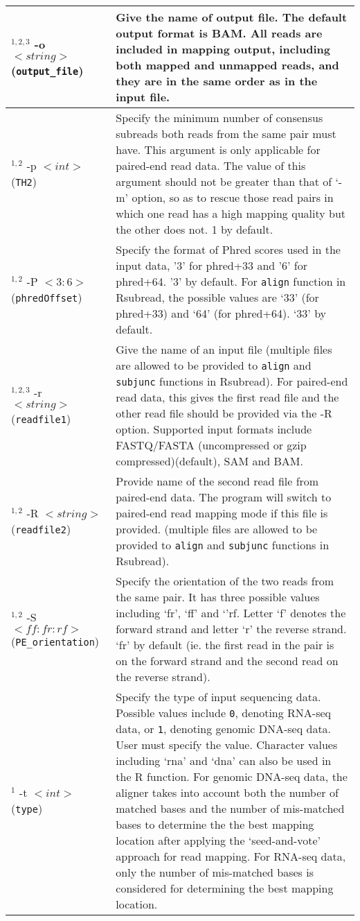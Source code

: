 \documentclass[12pt]{report}
\newcommand{\code}[1]{{\small\texttt{#1}}}
\newcommand{\Rsubread}{\textsf{Rsubread}}
\newcommand{\R}{\textsf{R}}
\begin{document}
\begin{longtable}{|p{5.5cm}|p{10.5cm}|}
\hline
$^{1,2,3}$ -o $<string>$ \newline (\code{output\_file}) & Give the name of output file. The default output format is BAM. All reads are included in mapping output, including both mapped and unmapped reads, and they are in the same order as in the input file.\\
\hline
$^{1,2}$ -p $<int>$ \newline (\code{TH2}) & Specify the minimum number of consensus subreads both reads from the same pair must have. This argument is only applicable for paired-end read data. The value of this argument should not be greater than that of `-m' option, so as to rescue those read pairs in which one read has a high mapping quality but the other does not. 1 by default.\\
\hline
$^{1,2}$ -P $<3:6>$ \newline (\code{phredOffset}) & Specify the format of Phred scores used in the input data, '3' for phred+33 and '6' for phred+64. '3' by default. For \code{align} function in \Rsubread, the possible values are `33' (for phred+33) and `64' (for phred+64). `33' by default.\\
\hline
$^{1,2,3}$ -r $<string>$ \newline (\code{readfile1}) & Give the name of an input file (multiple files are allowed to be provided to \code{align} and \code{subjunc} functions in {\Rsubread}). For paired-end read data, this gives the first read file and the other read file should be provided via the -R option. Supported input formats include FASTQ/FASTA (uncompressed or gzip compressed)(default), SAM and BAM.\\
\hline
$^{1,2}$ -R $<string>$ \newline (\code{readfile2}) & Provide name of the second read file from paired-end data. The program will switch to paired-end read mapping mode if this file is provided. (multiple files are allowed to be provided to \code{align} and \code{subjunc} functions in {\Rsubread}).\\
\hline
$^{1,2}$ -S $<ff:fr:rf>$ \newline (\code{PE\_orientation}) & Specify the orientation of the two reads from the same pair. It has three possible values including `fr', `ff' and `'rf. Letter `f' denotes the forward strand and letter `r' the reverse strand. `fr' by default (ie. the first read in the pair is on the forward strand and the second read on the reverse strand).\\
\hline
$^1$ -t $<int>$ \newline (\code{type}) & Specify the type of input sequencing data. Possible values include \code{0}, denoting RNA-seq data, or \code{1}, denoting genomic DNA-seq data. User must specify the value. Character values including `rna' and `dna' can also be used in the {\R} function.  For genomic DNA-seq data, the aligner takes into account both the number of matched bases and the number of mis-matched bases to determine the the best mapping location after applying the `seed-and-vote' approach for read mapping. For RNA-seq data, only the number of mis-matched bases is considered for determining the best mapping location. \\

\end{longtable}
\end{document}

